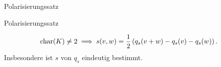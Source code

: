 \documentclass[class=article, crop=false]{standalone}
\begin{document}
\begin{zettel}{Polarisierungssatz}
\begin{flashcard}[qshhn3us]{Polarisierungssatz}

	\begin{theorem}
		\[
			\operatorname{char}(K) \neq  2 \implies s (v,w ) = \frac{1}{2} \left(q_s (v + w) - q_s(v) - q_s(w)\right)
		.\]
		Insbesondere ist $s$  von $q_s$ eindeutig bestimmt.
	\end{theorem}
\end{flashcard}

\end{zettel}
\end{document}
